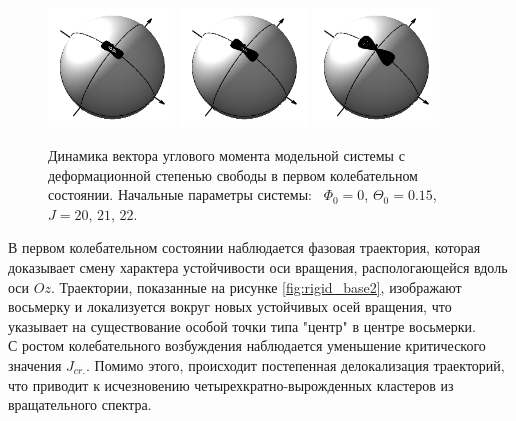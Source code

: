 \begin{figure}[H]
  \centering
	\includegraphics[width=0.3\textwidth]{../pictures/rigid_base/plot_J=20n=1.png}
	\includegraphics[width=0.3\textwidth]{../pictures/rigid_base/plot_J=21n=1.png}
	\includegraphics[width=0.3\textwidth]{../pictures/rigid_base/plot_J=22n=1.png} \\
	\caption{Динамика вектора углового момента модельной системы с деформационной степенью свободы в первом колебательном состоянии. Начальные параметры системы: \ $\Phi_0 = 0$, $\Theta_0 = 0.15$, $J = 20, \, 21, \, 22$.}
	\label{fig:rigid_base2}
\end{figure}

В первом колебательном состоянии наблюдается фазовая траектория, которая доказывает смену характера устойчивости оси вращения, распологающейся вдоль оси $Oz$. Траектории, показанные на рисунке \eqref{fig:rigid_base2}, изображают восьмерку и локализуется вокруг новых устойчивых осей вращения, что указывает на существование особой точки типа "центр" в центре восьмерки. \\
С ростом колебательного возбуждения наблюдается уменьшение критического значения $J_{cr.}$. Помимо этого, происходит постепенная делокализация траекторий, что приводит к исчезновению четырехкратно-вырожденных кластеров из вращательного спектра.